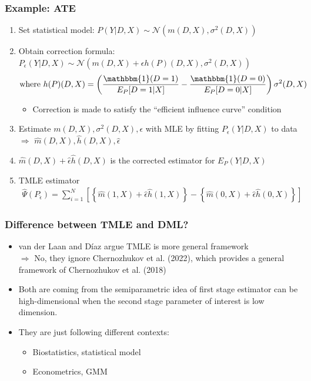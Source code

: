 \documentclass[aspectratio=169, 12pt]{beamer}
\newcommand{\I}{\mathbbm{1}}
\begin{document}
	\begin{frame}
	\frametitle{Example: ATE}
	\begin{enumerate}
	\item Set statistical model: $P(Y|D,X) \sim \mathcal{N}(m(D,X),\sigma^2(D,X)) $
	\item Obtain correction formula: $P_\epsilon(Y|D,X) \sim \mathcal{N}(m(D,X) + \epsilon h(P)(D,X),\sigma^2(D,X)) $
	\begin{eqnarray*}
	\text{where } h(P)(D,X) = \left(\frac{\I(D=1)}{E_P[D=1|X]} - \frac{\I(D=0)}{E_P[D=0|X]} \right) \sigma^2(D,X)
	\end{eqnarray*}
	\begin{itemize}
	\item Correction is made to satisfy the ``efficient influence curve'' condition
	\end{itemize}
	\item Estimate $m(D,X),\sigma^2(D,X),\epsilon $ with MLE by fitting $P_\epsilon(Y|D,X) $ to data \\
	$\Rightarrow $ $\hat{m}(D,X),\hat{h}(D,X),\hat{\epsilon} $
	\item $\hat{m}(D,X) + \hat{\epsilon} \hat{h}(D,X)$ is the corrected estimator for $E_P(Y|D,X)$
	\item TMLE estimator
	\begin{eqnarray*}
	\hat{\Psi}(P_{\hat{\epsilon}}) = \sum_{i=1}^N \left[ \left\{\hat{m}(1,X) + \hat{\epsilon} \hat{h}(1,X) \right\} - \left\{\hat{m}(0,X) + \hat{\epsilon} \hat{h}(0,X) \right\} \right]
	\end{eqnarray*}
	\end{enumerate}

	\end{frame}

	\begin{frame}
	\frametitle{Difference between TMLE and DML?}
	\begin{itemize}
	\item van der Laan and D\'iaz argue TMLE is more general framework\\
	$\Rightarrow $ No, they ignore Chernozhukov et al. (2022), which provides a general framework of Chernozhukov et al. (2018)
	\item Both are coming from the semiparametric idea of first stage estimator can be high-dimensional when the second stage parameter of interest is low dimension.
	\item They are just following different contexts:
	\begin{itemize}
	\item Biostatistics, statistical model
	\item Econometrics, GMM
	\end{itemize}
	\end{itemize}
	\end{frame}
\end{document}

